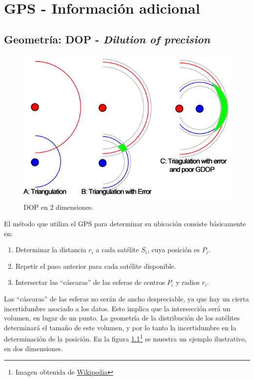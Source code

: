 \documentclass[main]{subfiles}
\begin{document}
\chapter{GPS - Información adicional}
\label{chap:gps-extra}

\section{Geometría: DOP - \textit{Dilution of precision}}
\label{sec:dop}

\begin{figure}
\vspace{-30pt}
  \begin{center}
    \includegraphics[width=.5\textwidth]{./pics_gps/dop.png}
  \end{center}
\vspace{-20pt}
  \caption{DOP en 2 dimensiones.}
\vspace{-50pt}
\label{fig:dop.png}
\end{figure}

El método que utiliza el GPS para determinar su ubicación consiste básicamente en:
\begin{enumerate}
\item Determinar la distancia $r_i$ a cada satélite $S_i$, cuya posición es $P_i$.
\item Repetir el paso anterior para cada satélite disponible.
\item Intersectar las ``cáscaras'' de las esferas de centros $P_i$ y radios $r_i$.
\end{enumerate}

Las ``cáscaras'' de las esferas no serán de ancho despreciable, ya que hay un cierta incertidumbre asociado a los datos. Esto implica que la intersección será un volumen, en lugar de un punto. La geometría de la distribución de los satélites determinará el tamaño de este volumen, y por lo tanto la incertidumbre en la determinación de la posición. En la figura \ref{fig:dop.png}\footnote{Imagen obtenida de \href{http://en.wikipedia.org/wiki/Dilution\_of\_precision\_(GPS)}{Wikipedia}} se muestra un ejemplo ilustrativo, en dos dimensiones.
\end{document}

